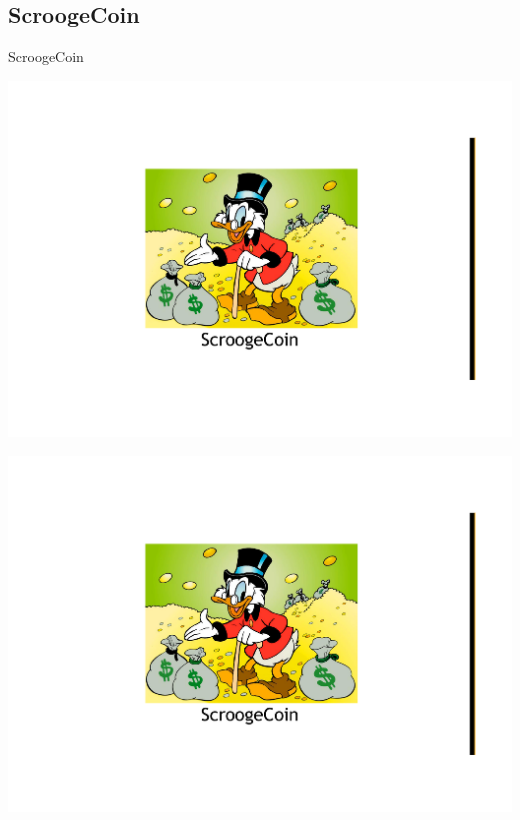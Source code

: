 \subsection{ScroogeCoin}

\begin{frame}{ScroogeCoin}

\begin{overprint}
\begin{center}
\includegraphics[width=\textwidth,page=1]{scrooge-coin}
\end{center}
\begin{center}
\includegraphics[width=\textwidth,page=2]{scrooge-coin}
\end{center}

\end{overprint}
\end{frame}
